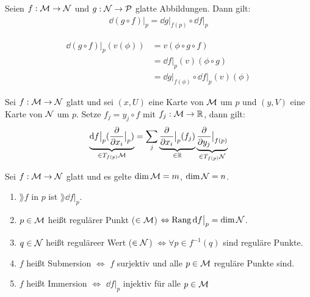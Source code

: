 \begin{satz}[Kettenregel]
\label{satz:Kettenregel}
Seien $f: \mathcal{M} \to \mathcal{N}$ und $g: \mathcal{N} \to \mathcal{P}$ glatte Abbildungen.
Dann gilt:
\begin{align}
\dd (g \circ f) \big\vert_p = \dd g \big\vert_{f(p)} \circ \dd f \big\vert_p
\end{align}
\end{satz}

\begin{bew} \leavevmode
\begin{align}
\dd (g \circ f) \big\vert_{p} (v (\phi)) &= v(\phi \circ g \circ f) \\
&= \dd f \big\vert_p (v)(\phi \circ g) \\
&= \dd g \big\vert_{f(\phi)} \circ \dd f \big\vert_p (v) (\phi)
\end{align}
\end{bew}

\begin{satz}
Sei $f: \mathcal{M} \to \mathcal{N}$ glatt und sei $(x, U)$ eine Karte von $\mathcal{M}$ um $p$ und $(y, V)$ eine Karte von $\mathcal{N}$ um $p$.
Setze $f_j = y_j \circ f$ mit $f_j : \mathcal{M} \to \mathbb{R}$, dann gilt:
\begin{align}
\underbrace{\dd f \big\vert_p ( \pdv{x_i} \big\vert_p)}_{\in T_{f(p)}\mathcal{M}} = \sum_j \underbrace{\pdv{x_i}\big\vert_p (f_j)}_{\in \mathbb{R}} \underbrace{\pdv{y_j} \big\vert_{f(p)}}_{\in T_{f(p)}\mathcal{N}}
\end{align}
\end{satz}

\begin{defs} 
Sei $f: \mathcal{M} \to \mathcal{N}$ glatt und es gelte $\dim\mathcal{M}=m$, $\dim{\mathcal{N}} = n$.
\begin{enumerate}
\item $\rang f$ in $p$ ist $\rang \dd f \big \vert_p $.
\item $p\in\mathcal{M}$ heißt regulärer Punkt ($\in\mathcal{M}$)  $\Leftrightarrow \operatorname{Rang}\dd f \big\vert_p=\dim\mathcal{N}$.
\item $q\in\mathcal{N}$ heißt reguläreer Wert ($\in\mathcal{N}$) $\Leftrightarrow \forall p \in f	^{-1}(q)$ sind reguläre Punkte.
\item $f$ heißt Submersion $\Leftrightarrow$ $f$ surjektiv und alle $p\in\mathcal{M}$ reguläre Punkte sind.
\item $f$ heißt Immersion $\Leftrightarrow$ $\dd f \big\vert_p$ injektiv für alle $p \in \mathcal{M}$
\end{enumerate}
\end{defs}

